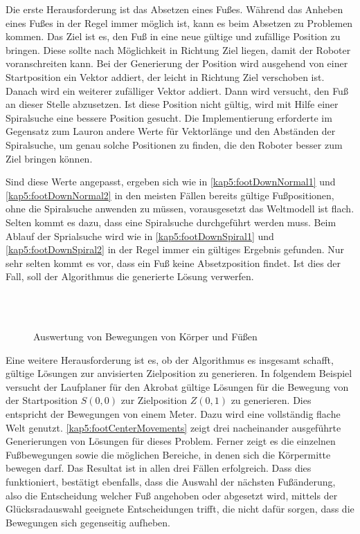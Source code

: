Die erste Herausforderung ist das Absetzen eines Fußes. Während das Anheben eines Fußes in der Regel immer möglich ist, kann es beim Absetzen zu Problemen kommen. Das Ziel ist es, den Fuß in eine neue gültige und zufällige Position zu bringen. Diese sollte nach Möglichkeit in Richtung Ziel liegen, damit der Roboter voranschreiten kann. Bei der Generierung der Position wird ausgehend von einer Startposition ein Vektor addiert, der leicht in Richtung Ziel verschoben ist. Danach wird ein weiterer zufälliger Vektor addiert. Dann wird versucht, den Fuß an dieser Stelle abzusetzen. Ist diese Position nicht gültig, wird mit Hilfe einer Spiralsuche eine bessere Position gesucht. Die Implementierung erforderte im Gegensatz zum Lauron andere Werte für Vektorlänge und den Abständen der Spiralsuche, um genau solche Positionen zu finden, die den Roboter besser zum Ziel bringen können.

Sind diese Werte angepasst, ergeben sich wie in \autoref{kap5:footDownNormal1} und \autoref{kap5:footDownNormal2} in den meisten Fällen bereits gültige Fußpositionen, ohne die Spiralsuche anwenden zu müssen, vorausgesetzt das Weltmodell ist flach. Selten kommt es dazu, dass eine Spiralsuche durchgeführt werden muss. Beim Ablauf der Sprialsuche wird wie in \autoref{kap5:footDownSpiral1} und \autoref{kap5:footDownSpiral2} in der Regel immer ein gültiges Ergebnis gefunden. Nur sehr selten kommt es vor, dass ein Fuß keine Absetzposition findet. Ist dies der Fall, soll der Algorithmus die generierte Lösung verwerfen.

\begin{figure}[b!]
    \begin{center}
    \resizebox{0.75\linewidth}{!}{
      
    }
    \\[\smallskipamount]
    \resizebox{0.75\linewidth}{!}{
      
    }
    \\[\smallskipamount]
    \resizebox{0.75\linewidth}{!}{
      
    }
    \caption{Auswertung von Bewegungen von Körper und Füßen}\label{kap5:footCenterMovements}
    \end{center}
\end{figure}

Eine weitere Herausforderung ist es, ob der Algorithmus es insgesamt schafft, gültige Lösungen zur anvisierten Zielposition zu generieren. In folgendem Beispiel versucht der Laufplaner für den Akrobat gültige Lösungen für die Bewegung von der Startposition $S(0,0)$ zur Zielposition $Z(0,1)$ zu generieren. Dies entspricht der Bewegungen von einem Meter. Dazu wird eine vollständig flache Welt genutzt. \autoref{kap5:footCenterMovements} zeigt drei nacheinander ausgeführte Generierungen von Lösungen für dieses Problem. Ferner zeigt es die einzelnen Fußbewegungen sowie die möglichen Bereiche, in denen sich die Körpermitte bewegen darf. Das Resultat ist in allen drei Fällen erfolgreich. Dass dies funktioniert, bestätigt ebenfalls, dass die Auswahl der nächsten Fußänderung, also die Entscheidung welcher Fuß angehoben oder abgesetzt wird, mittels der Glücksradauswahl geeignete Entscheidungen trifft, die nicht dafür sorgen, dass die Bewegungen sich gegenseitig aufheben.